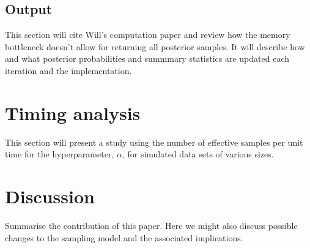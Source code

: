 \subsection{Output}
\label{subsec:output}
This section will cite Will's computation paper and review how the memory bottleneck doesn't allow for returning all posterior samples. It will describe how and what posterior probabilities and summmary statistics are updated each iteration and the implementation.

\section{Timing analysis}
This section will present a study using the number of effective samples per unit time for the hyperparameter, $\alpha$, for simulated data sets of various sizes.

\section{Discussion}
Summarise the contribution of this paper. Here we might also discuss possible changes to the sampling model and the associated implications.




